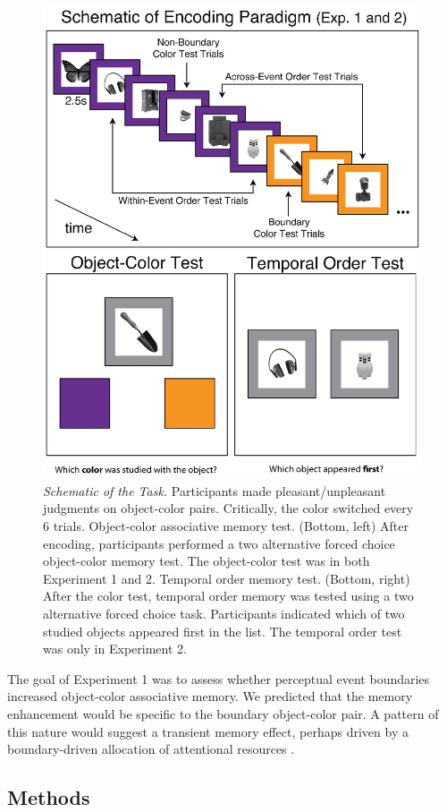 \begin{figure}
  \centering
  \includegraphics[width=.75\textwidth]{figures/chapter1_figure1.eps}
  \caption[Schematic of the Task]{\textit{Schematic of the Task.} Participants made pleasant/unpleasant judgments on object-color pairs.  Critically, the color switched every 6 trials. Object-color associative memory test. (Bottom, left)  After encoding, participants performed a two alternative forced choice object-color memory test. The object-color test was in both Experiment 1 and 2.  Temporal order memory test.  (Bottom, right) After the color test, temporal order memory was tested using a two alternative forced choice task.  Participants indicated which of two studied objects appeared first in the list. The temporal order test was only in Experiment 2.}
  \label{chapter1_figure1}
\end{figure}

The goal of Experiment 1 was to assess whether perceptual event
boundaries increased object-color associative memory. We predicted that
the memory enhancement would be specific to the boundary object-color
pair. A pattern of this nature would suggest a transient memory effect,
perhaps driven by a boundary-driven allocation of attentional resources
\autocite{kurby_segmentation_2008}.

\subsection{Methods}\label{methods}

